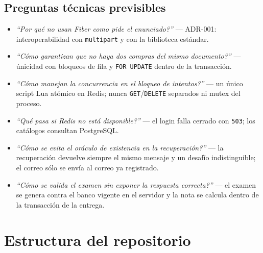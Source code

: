 \documentclass[11pt,a4paper]{article}
\newcommand{\code}[1]{\texttt{#1}}
\begin{document}
\subsection*{Preguntas t\'ecnicas previsibles}

\begin{itemize}
  \item \emph{``Por qu\'e no usan Fiber como pide el enunciado?''} --- ADR-001:
        interoperabilidad con \code{multipart} y con la biblioteca est\'andar.
  \item \emph{``C\'omo garantizan que no haya dos compras del mismo documento?''} ---
        \'unicidad con bloqueos de fila y \code{FOR UPDATE} dentro de la transacci\'on.
  \item \emph{``C\'omo manejan la concurrencia en el bloqueo de
        intentos?''} --- un \'unico script Lua at\'omico en Redis; nunca \code{GET}/\code{DELETE} separados ni
        mutex del proceso.
  \item \emph{``Qu\'e pasa si Redis no est\'a disponible?''} --- el login
        falla cerrado con \code{503}; los cat\'alogos consultan PostgreSQL.
  \item \emph{``C\'omo se evita el or\'aculo de existencia en la
        recuperaci\'on?''} --- la recuperaci\'on devuelve siempre el mismo mensaje y un desaf\'io indistinguible;
        el correo s\'olo se env\'ia al correo ya registrado.
  \item \emph{``C\'omo se valida el examen sin exponer la respuesta
        correcta?''} --- el examen se genera contra el banco vigente en el servidor y la nota se calcula
        dentro de la transacci\'on de la entrega.
\end{itemize}

\appendix
\section{Estructura del repositorio}
\end{document}
